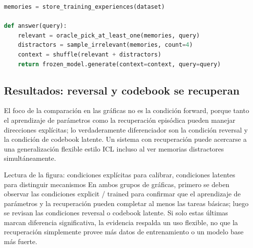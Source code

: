 \begin{lstlisting}[language=Python,caption={Separación de responsabilidades en el experimento de recuperación episódica de oracle}]
memories = store_training_experiences(dataset)

def answer(query):
    relevant = oracle_pick_at_least_one(memories, query)
    distractors = sample_irrelevant(memories, count=4)
    context = shuffle(relevant + distractors)
    return frozen_model.generate(context=context, query=query)
\end{lstlisting}


\subsection{Resultados: reversal y codebook se recuperan}

El foco de la comparación en las gráficas no es la condición forward, porque tanto el aprendizaje de parámetros como la recuperación episódica pueden manejar direcciones explícitas; lo verdaderamente diferenciador son la condición reversal y la condición de codebook latente. Un sistema con recuperación puede acercarse a una generalización flexible estilo ICL incluso al ver memorias distractores simultáneamente.


\begin{knowledgebox}{Lectura de la figura: condiciones explícitas para calibrar, condiciones latentes para distinguir mecanismos}
En ambos grupos de gráficas, primero se deben observar las condiciones explicit / trained para confirmar que el aprendizaje de parámetros y la recuperación pueden completar al menos las tareas básicas; luego se revisan las condiciones reversal o codebook latente. Si solo estas últimas marcan diferencia significativa, la evidencia respalda un uso flexible, no que la recuperación simplemente provee más datos de entrenamiento o un modelo base más fuerte.
\end{knowledgebox}

